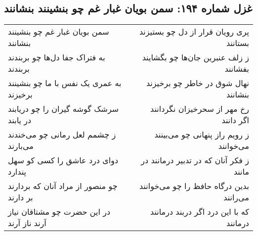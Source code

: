 \begin{center}
\section*{غزل شماره ۱۹۴: سمن بویان غبار غم چو بنشینند بنشانند}
\label{sec:sh194}
\begin{longtable}{l p{0.5cm} r}
سمن بویان غبار غم چو بنشینند بنشانند
&&
پری رویان قرار از دل چو بستیزند بستانند
\\
به فتراک جفا دل‌ها چو بربندند بربندند
&&
ز زلف عنبرین جان‌ها چو بگشایند بفشانند
\\
به عمری یک نفس با ما چو بنشینند برخیزند
&&
نهال شوق در خاطر چو برخیزند بنشانند
\\
سرشک گوشه گیران را چو دریابند در یابند
&&
رخ مهر از سحرخیزان نگردانند اگر دانند
\\
ز چشمم لعل رمانی چو می‌خندند می‌بارند
&&
ز رویم راز پنهانی چو می‌بینند می‌خوانند
\\
دوای درد عاشق را کسی کو سهل پندارد
&&
ز فکر آنان که در تدبیر درمانند در مانند
\\
چو منصور از مراد آنان که بردارند بر دارند
&&
بدین درگاه حافظ را چو می‌خوانند می‌رانند
\\
در این حضرت چو مشتاقان نیاز آرند ناز آرند
&&
که با این درد اگر دربند درمانند درمانند
\\
\end{longtable}
\end{center}
